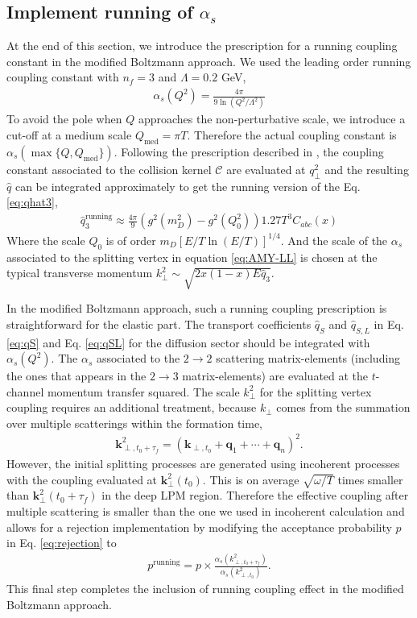 \documentclass[aps, prc, reprint, amsmath, groupedaddress, nofootinbib]{revtex4-1}
\begin{document}
\subsection{Implement running of $\alpha_s$}\label{section:running}
At the end of this section, we introduce the prescription for a running coupling constant in the modified Boltzmann approach.
We used the leading order running coupling constant with $n_f = 3$ and $\Lambda = 0.2$ GeV, 
\begin{eqnarray}
\alpha_s(Q^2) = \frac{4\pi}{9\ln\left(Q^2/\Lambda^2\right)}
\end{eqnarray}
To avoid the pole when $Q$ approaches the non-perturbative scale, we introduce a cut-off at a medium scale $Q_{\textrm{med}} = \pi T$. 
Therefore the actual coupling constant is $\alpha_s(\max\{Q, Q_{\textrm{med}}\})$.
Following the prescription described in \cite{Arnold:2008zu}, the coupling constant associated to the collision kernel $\mathcal{C}$ are evaluated at $q_\perp^2$ and the resulting $\hat{q}$ can be integrated approximately to get the running version of the Eq. \ref{eq:qhat3},
\begin{eqnarray}
\hat{q}_3^{\textrm{running}} \approx \frac{4\pi}{9}\left(g^2(m_D^2) - g^2(Q_0^2)\right) 1.27 T^3 C_{abc}(x)
\label{eq:q3running}
\end{eqnarray}
Where the scale $Q_0$ is of order $m_D [E/T \ln(E/T)]^{1/4}$.
And the scale of the $\alpha_s$ associated to the splitting  vertex in equation \ref{eq:AMY-LL} is chosen at the typical transverse momentum $k_\perp^2 \sim \sqrt{2x(1-x)E\hat{q}_3}$.

In the modified Boltzmann approach, such a running coupling prescription is straightforward for the elastic part.
The transport coefficients $\hat{q}_S$ and $\hat{q}_{S, L}$ in Eq. \ref{eq:qS} and Eq. \ref{eq:qSL} for the diffusion sector should be integrated with $\alpha_s(Q^2)$.
The $\alpha_s$ associated to the $2\rightarrow 2$ scattering matrix-elements (including the ones that appears in the $2\rightarrow 3$ matrix-elements) are evaluated at the $t$-channel momentum transfer squared.
The scale $k_\perp^2$ for the splitting vertex coupling requires an additional treatment, because $k_\perp$ comes from the summation over multiple scatterings within the formation time,
\begin{eqnarray}\label{eq:kTn}
\mathbf{k}_{\perp, t_0+\tau_f}^2 = \left(\mathbf{k}_{\perp,t_0}+\mathbf{q}_1+\cdots+\mathbf{q}_n\right)^2.
\end{eqnarray} 
However, the initial splitting processes are generated using incoherent processes with the coupling evaluated at $\mathbf{k}_{\perp}^2(t_0)$.
This is on average $\sqrt{\omega/T}$ times smaller than $\mathbf{k}_{\perp}^2(t_0+\tau_f)$ in the deep LPM region.
Therefore the effective coupling after multiple scattering is smaller than the one we used in incoherent calculation and allows for a rejection implementation by modifying the acceptance probability $p$ in Eq. \ref{eq:rejection} to
\begin{eqnarray}
p^{\textrm{running}} = p\times \frac{\alpha_s(k_{\perp,t_0+\tau_f}^2)}{\alpha_s(k_{\perp,t_0}^2)}.
\end{eqnarray}
This final step completes the inclusion of running coupling effect in the modified Boltzmann approach.
\end{document}
